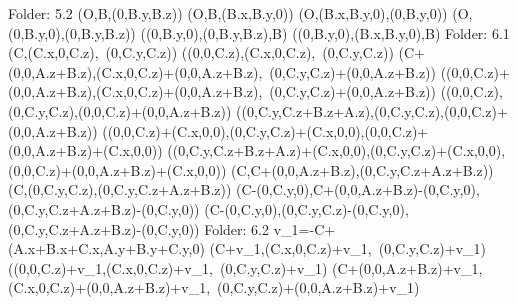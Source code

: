 Folder: 5.2
\left(O,B,\left(0,B.y,B.z\right)\right)
\left(O,B,\left(B.x,B.y,0\right)\right)
\left(O,\left(B.x,B.y,0\right),\left(0,B.y,0\right)\right)
\left(O,\left(0,B.y,0\right),\left(0,B.y,B.z\right)\right)
\left(\left(0,B.y,0\right),\left(0,B.y,B.z\right),B\right)
\left(\left(0,B.y,0\right),\left(B.x,B.y,0\right),B\right)
Folder: 6.1
\left(C,\left(C.x,0,C.z\right),\ \left(0,C.y,C.z\right)\right)
\left(\left(0,0,C.z\right),\left(C.x,0,C.z\right),\ \left(0,C.y,C.z\right)\right)
\left(C+\left(0,0,A.z+B.z\right),\left(C.x,0,C.z\right)+\left(0,0,A.z+B.z\right),\ \left(0,C.y,C.z\right)+\left(0,0,A.z+B.z\right)\right)
\left(\left(0,0,C.z\right)+\left(0,0,A.z+B.z\right),\left(C.x,0,C.z\right)+\left(0,0,A.z+B.z\right),\ \left(0,C.y,C.z\right)+\left(0,0,A.z+B.z\right)\right)
\left(\left(0,0,C.z\right),\left(0,C.y,C.z\right),\left(0,0,C.z\right)+\left(0,0,A.z+B.z\right)\right)
\left(\left(0,C.y,C.z+B.z+A.z\right),\left(0,C.y,C.z\right),\left(0,0,C.z\right)+\left(0,0,A.z+B.z\right)\right)
\left(\left(0,0,C.z\right)+\left(C.x,0,0\right),\left(0,C.y,C.z\right)+\left(C.x,0,0\right),\left(0,0,C.z\right)+\left(0,0,A.z+B.z\right)+\left(C.x,0,0\right)\right)
\left(\left(0,C.y,C.z+B.z+A.z\right)+\left(C.x,0,0\right),\left(0,C.y,C.z\right)+\left(C.x,0,0\right),\left(0,0,C.z\right)+\left(0,0,A.z+B.z\right)+\left(C.x,0,0\right)\right)
\left(C,C+\left(0,0,A.z+B.z\right),\left(0,C.y,C.z+A.z+B.z\right)\right)
\left(C,\left(0,C.y,C.z\right),\left(0,C.y,C.z+A.z+B.z\right)\right)
\left(C-\left(0,C.y,0\right),C+\left(0,0,A.z+B.z\right)-\left(0,C.y,0\right),\left(0,C.y,C.z+A.z+B.z\right)-\left(0,C.y,0\right)\right)
\left(C-\left(0,C.y,0\right),\left(0,C.y,C.z\right)-\left(0,C.y,0\right),\left(0,C.y,C.z+A.z+B.z\right)-\left(0,C.y,0\right)\right)
Folder: 6.2
v_{1}=-C+\left(A.x+B.x+C.x,A.y+B.y+C.y,0\right)
\left(C+v_{1},\left(C.x,0,C.z\right)+v_{1},\ \left(0,C.y,C.z\right)+v_{1}\right)
\left(\left(0,0,C.z\right)+v_{1},\left(C.x,0,C.z\right)+v_{1},\ \left(0,C.y,C.z\right)+v_{1}\right)
\left(C+\left(0,0,A.z+B.z\right)+v_{1},\left(C.x,0,C.z\right)+\left(0,0,A.z+B.z\right)+v_{1},\ \left(0,C.y,C.z\right)+\left(0,0,A.z+B.z\right)+v_{1}\right)
